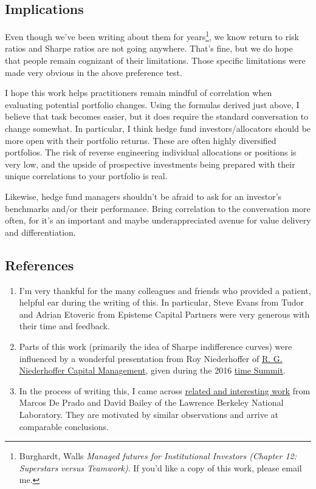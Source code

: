 \documentclass[]{article}
\providecommand{\tightlist}{%
  \setlength{\itemsep}{0pt}\setlength{\parskip}{0pt}}
\let\rmarkdownfootnote\footnote%
\def\footnote{\protect\rmarkdownfootnote}
\begin{document}
\hypertarget{implications}{%
\subsection{Implications}\label{implications}}

Even though we've been writing about them for years\footnote{Burghardt,
  Walls \emph{Managed futures for Institutional Investors (Chapter 12:
  Superstars versus Teamwork)}. If you'd like a copy of this work,
  please email me.}, we know return to risk ratios and Sharpe ratios are
not going anywhere. That's fine, but we do hope that people remain
cognizant of their limitations. Those specific limitations were made
very obvious in the above preference test.

I hope this work helps practitioners remain mindful of correlation when
evaluating potential portfolio changes. Using the formulas derived just
above, I believe that task becomes easier, but it does require the
standard conversation to change somewhat. In particular, I think hedge
fund investors/allocators should be more open with their portfolio
returns. These are often highly diversified portfolios. The risk of
reverse engineering individual allocations or positions is very low, and
the upside of prospective investments being prepared with their unique
correlations to your portfolio is real.

Likewise, hedge fund managers shouldn't be afraid to ask for an
investor's benchmarks and/or their performance. Bring correlation to the
conversation more often, for it's an important and maybe
underappreciated avenue for value delivery and differentiation.

\hypertarget{references}{%
\subsection{References}\label{references}}

\begin{enumerate}
\def\labelenumi{\arabic{enumi}.}
\tightlist
\item
  I'm very thankful for the many colleagues and friends who provided a
  patient, helpful ear during the writing of this. In particular, Steve
  Evans from Tudor and Adrian Etoveric from Episteme Capital Partners
  were very generous with their time and feedback.
\item
  Parts of this work (primarily the idea of Sharpe indifference curves)
  were influenced by a wonderful presentation from Roy Niederhoffer of
  \href{https://www.niederhoffer.com/}{R. G. Niederhoffer Capital
  Management}, given during the 2016 \href{timesummit.org}{time Summit}.
\item
  In the process of writing this, I came across
  \href{https://pdfs.semanticscholar.org/c094/f7fd32f6e5c36f121a0d246d6127587a473a.pdf}{related
  and interesting work} from Marcos De Prado and David Bailey of the
  Lawrence Berkeley National Laboratory. They are motivated by similar
  observations and arrive at comparable conclusions.
\end{enumerate}
\end{document}
